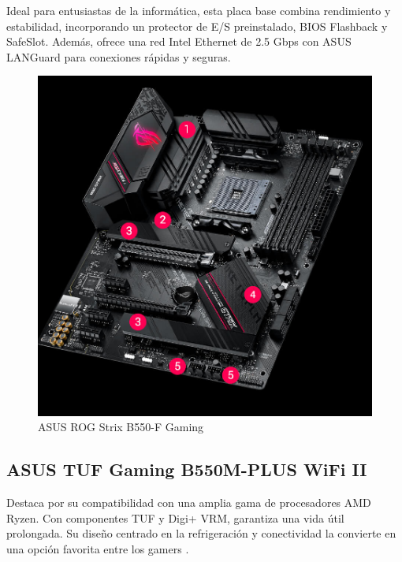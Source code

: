 Ideal para entusiastas de la informática, esta placa base combina rendimiento y estabilidad, incorporando un protector de E/S preinstalado, BIOS Flashback y SafeSlot. Además, ofrece una red Intel Ethernet de 2.5 Gbps con ASUS LANGuard para conexiones rápidas y seguras\cite{lavanguardiaB550F}.

\begin{figure}
  \centering
  \includegraphics[scale=0.1]{imagenes/strix.png}
  \caption{ASUS ROG Strix B550-F Gaming}
\end{figure}

\subsection{ASUS TUF Gaming B550M-PLUS WiFi II}

Destaca por su compatibilidad con una amplia gama de procesadores AMD Ryzen. Con componentes TUF y Digi+ VRM, garantiza una vida útil prolongada. Su diseño centrado en la refrigeración y conectividad la convierte en una opción favorita entre los gamers \cite{lavanguardiaTUF}.

